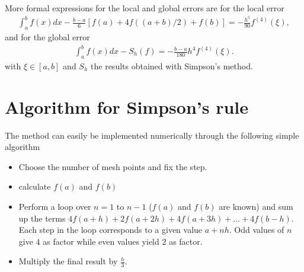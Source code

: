 \documentclass[letterpaper,10pt,english]{sphinxmanual}
\begin{document}
More formal expressions for the local and global errors are for the local error
\begin{equation*}
\begin{split}
\int_a^bf(x)dx -\frac{b-a}{6}\left[f(a)+4f((a+b)/2)+f(b)\right]=-\frac{h^5}{90}f^{(4)}(\xi),
\end{split}
\end{equation*}
and for the global error
\begin{equation*}
\begin{split}
\int_a^bf(x)dx -S_h(f)=-\frac{b-a}{180}h^4f^{(4)}(\xi).
\end{split}
\end{equation*}
with \(\xi\in[a,b]\) and \(S_h\) the results obtained with Simpson’s method.


\section{Algorithm for Simpson’s rule}
\label{\detokenize{chapter1:algorithm-for-simpson-s-rule}}
The method
can easily be implemented numerically through the following simple algorithm
\begin{itemize}
\item {} 
Choose the number of mesh points and fix the step.

\item {} 
calculate \(f(a)\) and \(f(b)\)

\item {} 
Perform a loop over \(n=1\) to \(n-1\) (\(f(a)\) and \(f(b)\) are known) and sum up   the terms \(4f(a+h) +2f(a+2h)+4f(a+3h)+\dots +4f(b-h)\). Each step in the loop  corresponds to a given value \(a+nh\). Odd values of \(n\) give \(4\) as factor  while even values yield \(2\) as factor.

\item {} 
Multiply the final result by \(\frac{h}{3}\).

\end{itemize}
\end{document}

